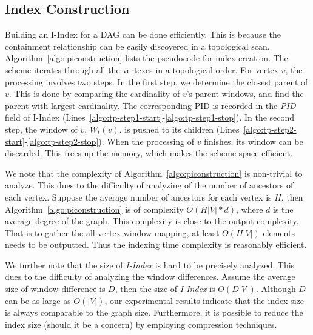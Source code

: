 \subsection{Index Construction} 
Building an I-Index for a DAG
can be done efficiently. 
This is because the containment relationship can be easily 
discovered in a topological scan.
Algorithm~\ref{algo:piconstruction} lists the pseudocode for 
index creation. 
The scheme iterates through all the vertexes in a topological order.
For vertex $v$, the processing involves two steps.
In the first step, we determine the closest parent
of $v$. This is done by comparing the cardinality of $v$'s parent windows,
and find the parent with largest cardinality. 
The corresponding PID is recorded in the \emph{PID} field of 
I-Index (Lines~\ref{algo:tp-step1-start}-\ref{algo:tp-step1-stop}). 
In the second step, the window of $v$, $W_t(v)$, is pushed to 
its children (Lines~\ref{algo:tp-step2-start}-\ref{algo:tp-step2-stop}). 
When the processing of $v$ finishes, its window can be discarded. This
frees up the memory, which makes the scheme space efficient.

We note that the complexity of Algorithm~\ref{algo:piconstruction} is non-trivial to analyze. 
This dues to the difficulty of analyzing of the number of ancestors of each vertex. Suppose the 
average number of ancestors for each vertex is $H$, then Algorithm~\ref{algo:piconstruction} is of
complexity $O(H|V|*d)$, where $d$ is the average degree of the graph. This complexity is close to the
output complexity. That is to gather the all vertex-window mapping, at least $O(H|V|)$ elements needs
to be outputted. Thus the indexing time complexity is reasonably efficient.

We further note that the size of \emph{I-Index} is hard to be precisely analyzed. 
This dues to the difficulty of analyzing the window differences.
Assume the average size of window difference
is $D$, then the size of \emph{I-Index} is $O(D|V|)$. Although $D$ can be as large as $O(|V|)$, our 
experimental results indicate that the index size is always 
comparable to the graph size. Furthermore, it is possible to
reduce the index size (should it be a concern) by employing
compression techniques. 

